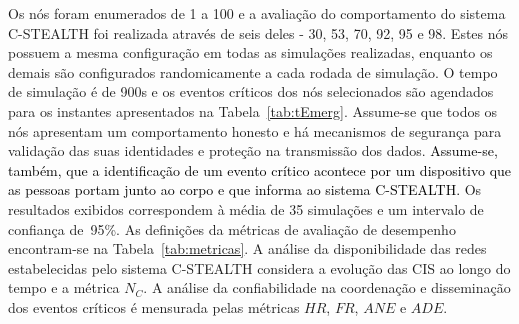 \documentclass[12pt]{article}
\newcommand{\rev}[1]{\textcolor{black}{{#1}}}
\begin{document}
Os nós foram enumerados de 1 a 100 e a avaliação do comportamento do sistema \mbox{C-STEALTH} foi realizada através de seis deles - 30, 53, 70, 92, 95 e 98. Estes nós possuem a mesma configuração em todas as simulações realizadas, enquanto os demais
são configurados randomicamente a cada rodada de simulação. O tempo de simulação é de 900s e os eventos críticos dos nós selecionados são agendados para os instantes apresentados na Tabela~\ref{tab:tEmerg}. Assume-se que todos os nós apresentam um comportamento honesto e há mecanismos de segurança para validação das suas identidades e proteção na transmissão dos dados. \rev{Assume-se, também, que a identificação de um evento crítico acontece por um dispositivo que as pessoas portam junto ao corpo e que informa ao sistema \mbox{C-STEALTH}.} Os resultados exibidos correspondem à média de 35 simulações e um intervalo de confiança de~95\%. As definições da métricas de avaliação de desempenho %
encontram-se na Tabela~\ref{tab:metricas}. %
A análise da disponibilidade das redes estabelecidas pelo sistema \mbox{C-STEALTH} considera a evolução das
CIS
ao longo do tempo e a métrica $N_{C}$. A análise da confiabilidade na coordenação e disseminação dos eventos críticos é mensurada pelas métricas $HR$, $FR$, $ANE$ e $ADE$.
\vspace{-0.2cm}

\begin{comment}

\begin{table}[H]
\centering
\begin{threeparttable}
\caption{Agendamento dos Eventos Críticos}
\label{tab:tEmerg}
{\footnotesize
\begin{tabular}{l|ccc}
\hlineB{2}
\textbf{Nós} & 30 e 53 & 70 e 98 & 92 e 95 \bigstrut \\ \hline
\textbf{Tempo (s)} & 360 & 300 & 350  \bigstrut \\ \hlineB{2}
\end{tabular}}
\end{threeparttable}
\end{table}

\end{comment}
\end{document}

